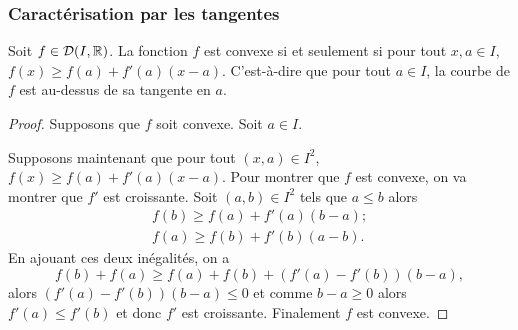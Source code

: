 \subsubsection{Caractérisation par les tangentes}

\begin{theo}
  Soit \(f \in \mathcal{D}(I,\mathbb{R})\). La fonction \(f\) est convexe si et seulement si pour tout \(x,a \in I\), \(f(x) \geqslant f(a)+f'(a)(x-a)\). C'est-à-dire que pour tout \(a \in I\), la courbe de \(f\) est au-dessus de sa tangente en \(a\).
\end{theo}
\begin{proof}
  Supposons que \(f\) soit convexe. Soit \(a \in I\).

  Supposons maintenant que  pour tout \((x,a) \in I^2\), \(f(x) \geqslant f(a)+f'(a)(x-a)\). Pour montrer que \(f\) est convexe, on va montrer que \(f'\) est croissante. Soit \((a,b) \in I^2\) tels que \(a \leqslant b\) alors
  \begin{align}
    f(b) \geqslant f(a)+f'(a)(b-a); \\
    f(a) \geqslant f(b)+f'(b)(a-b).
  \end{align}
  En ajouant ces deux inégalités, on a
  \begin{equation}
    f(b)+f(a) \geqslant f(a)+f(b) +(f'(a)-f'(b))(b-a),
  \end{equation}
  alors \((f'(a)-f'(b))(b-a) \leqslant 0\) et comme \(b-a \geqslant 0\) alors \(f'(a) \leqslant f'(b)\) et donc \(f'\) est croissante. Finalement \(f\) est convexe.
\end{proof}

